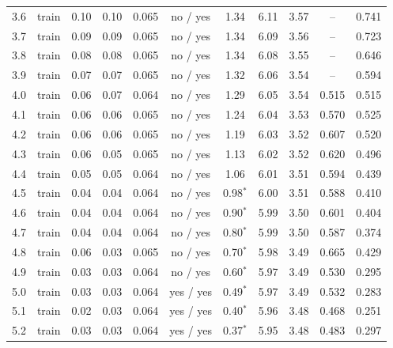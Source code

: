 {\begin{longtable}{llccccccccc}
\rule[-3pt]{0pt}{11.5pt} 3.6 & train & 0.10 & 0.10 & 0.065 & no / yes & 1.34 & 6.11 & 3.57 & -- & 0.741 \\
\rule[-3pt]{0pt}{11.5pt} 3.7 & train & 0.09 & 0.09 & 0.065 & no / yes & 1.34 & 6.09 & 3.56 & -- & 0.723 \\
\rule[-3pt]{0pt}{11.5pt} 3.8 & train & 0.08 & 0.08 & 0.065 & no / yes & 1.34 & 6.08 & 3.55 & -- & 0.646 \\
\rule[-3pt]{0pt}{11.5pt} 3.9 & train & 0.07 & 0.07 & 0.065 & no / yes & 1.32 & 6.06 & 3.54 & -- & 0.594 \\
\rule[-3pt]{0pt}{11.5pt} 4.0 & train & 0.06 & 0.07 & 0.064 & no / yes & 1.29 & 6.05 & 3.54 & 0.515 & 0.515 \\
\rule[-3pt]{0pt}{11.5pt} 4.1 & train & 0.06 & 0.06 & 0.065 & no / yes & 1.24 & 6.04 & 3.53 & 0.570 & 0.525 \\
\rule[-3pt]{0pt}{11.5pt} 4.2 & train & 0.06 & 0.06 & 0.065 & no / yes & 1.19 & 6.03 & 3.52 & 0.607 & 0.520 \\
\rule[-3pt]{0pt}{11.5pt} 4.3 & train & 0.06 & 0.05 & 0.065 & no / yes & 1.13 & 6.02 & 3.52 & 0.620 & 0.496 \\
\rule[-3pt]{0pt}{11.5pt} 4.4 & train & 0.05 & 0.05 & 0.064 & no / yes & 1.06 & 6.01 & 3.51 & 0.594 & 0.439 \\
\rule[-3pt]{0pt}{11.5pt} 4.5 & train & 0.04 & 0.04 & 0.064 & no / yes & 0.98$^{\ast}$ & 6.00 & 3.51 & 0.588 & 0.410 \\
\rule[-3pt]{0pt}{11.5pt} 4.6 & train & 0.04 & 0.04 & 0.064 & no / yes & 0.90$^{\ast}$ & 5.99 & 3.50 & 0.601 & 0.404 \\
\rule[-3pt]{0pt}{11.5pt} 4.7 & train & 0.04 & 0.04 & 0.064 & no / yes & 0.80$^{\ast}$ & 5.99 & 3.50 & 0.587 & 0.374 \\
\rule[-3pt]{0pt}{11.5pt} 4.8 & train & 0.06 & 0.03 & 0.065 & no / yes & 0.70$^{\ast}$ & 5.98 & 3.49 & 0.665 & 0.429 \\
\rule[-3pt]{0pt}{11.5pt} 4.9 & train & 0.03 & 0.03 & 0.064 & no / yes & 0.60$^{\ast}$ & 5.97 & 3.49 & 0.530 & 0.295 \\
\rule[-3pt]{0pt}{11.5pt} 5.0 & train & 0.03 & 0.03 & 0.064 & yes / yes & 0.49$^{\ast}$ & 5.97 & 3.49 & 0.532 & 0.283 \\
\rule[-3pt]{0pt}{11.5pt} 5.1 & train & 0.02 & 0.03 & 0.064 & yes / yes & 0.40$^{\ast}$ & 5.96 & 3.48 & 0.468 & 0.251 \\
\rule[-3pt]{0pt}{11.5pt} 5.2 & train & 0.03 & 0.03 & 0.064 & yes / yes & 0.37$^{\ast}$ & 5.95 & 3.48 & 0.483 & 0.297 \\

\end{longtable}}
